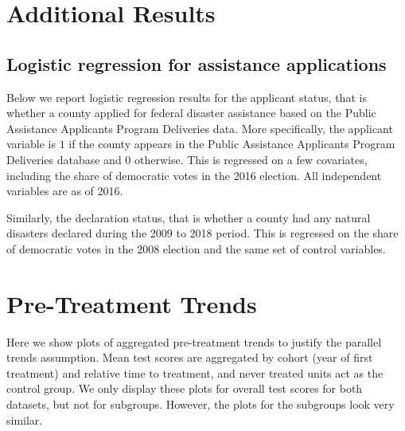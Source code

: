
\section{Additional Results} \label{AppendixA}

\subsection{Logistic regression for assistance applications}

Below we report logistic regression results for the applicant status, that is whether a county applied for federal disaster assistance based on the Public Assistance Applicants Program Deliveries data. More specifically, the applicant variable is $1$ if the county appears in the Public Assistance Applicants Program Deliveries database and $0$ otherwise. This is regressed on a few covariates, including the share of democratic votes in the 2016 election. All independent variables are as of 2016.

Similarly, the declaration status, that is whether a county had any natural disasters declared during the 2009 to 2018 period. This is regressed on the share of democratic votes in the 2008 election and the same set of control variables.




\section{Pre-Treatment Trends} \label{PreTrends}

Here we show plots of aggregated pre-treatment trends to justify the parallel trends assumption. Mean test scores are aggregated by cohort (year of first treatment) and relative time to treatment, and never treated units act as the control group. We only display these plots for overall test scores for both datasets, but not for subgroups. However, the plots for the subgroups look very similar.

